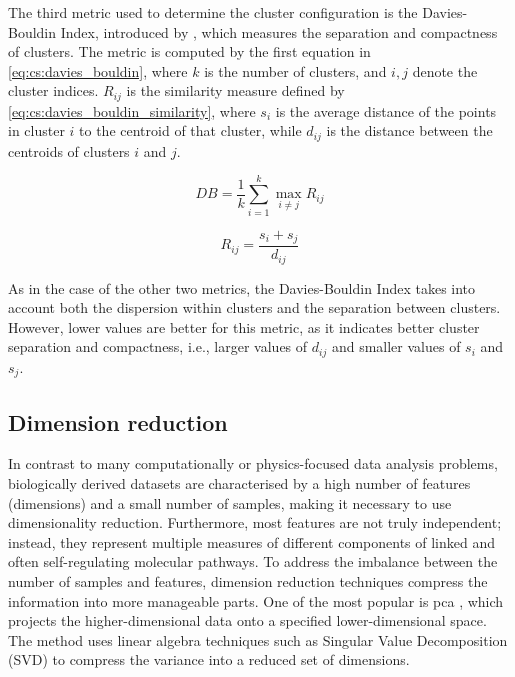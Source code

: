 The third metric used to determine the cluster configuration is the Davies-Bouldin Index, introduced by \citet{Davies1979-tn}, which measures the separation and compactness of clusters. The metric is computed by the first equation in \cref{eq:cs:davies_bouldin}, where \(k\) is the number of clusters, and \(i, j\) denote the cluster indices. \(R_{ij}\) is the similarity measure defined by \cref{eq:cs:davies_bouldin_similarity}, where \(s_i\) is the average distance of the points in cluster \(i\) to the centroid of that cluster, while \(d_{ij}\) is the distance between the centroids of clusters \(i\) and \(j\).

\begin{equation} \label{eq:cs:davies_bouldin}
    DB = \frac{1}{k} \sum_{i=1}^k \max_{i \neq j} R_{ij}
\end{equation}

\begin{equation} \label{eq:cs:davies_bouldin_similarity}
    R_{ij} = \frac{s_i + s_j}{d_{ij}}
\end{equation}

As in the case of the other two metrics, the Davies-Bouldin Index takes into account both the dispersion within clusters and the separation between clusters. However, lower values are better for this metric, as it indicates better cluster separation and compactness, i.e., larger values of \(d_{ij}\) and smaller values of \(s_i\) and \(s_j\).


\subsection{Dimension reduction} \label{s:lit:dim_red}

In contrast to many computationally or physics-focused data analysis problems, biologically derived datasets are characterised by a high number of features (dimensions) and a small number of samples, making it necessary to use dimensionality reduction. Furthermore, most features are not truly independent; instead, they represent multiple measures of different components of linked and often self-regulating molecular pathways. To address the imbalance between the number of samples and features, dimension reduction techniques compress the information into more manageable parts. One of the most popular is \acrfull{pca} \citep{Hotelling1936-qq, Pearson1901-zd}, which projects the higher-dimensional data onto a specified lower-dimensional space. The method uses linear algebra techniques such as Singular Value Decomposition (SVD) to compress the variance into a reduced set of dimensions.

